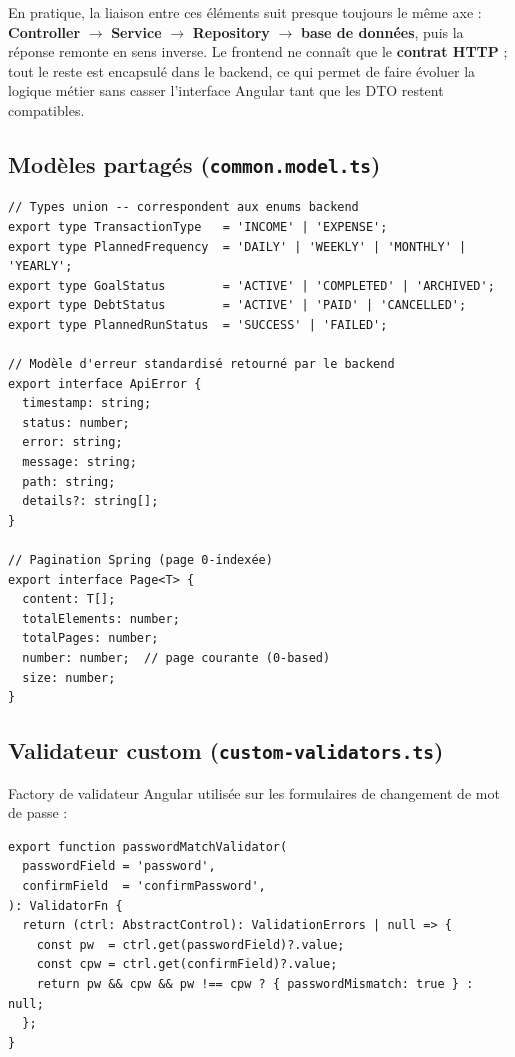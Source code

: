\documentclass[12pt,a4paper]{article}
\begin{document}
En pratique, la liaison entre ces éléments suit presque toujours le même axe :
\textbf{Controller} $\rightarrow$ \textbf{Service} $\rightarrow$ \textbf{Repository}
$\rightarrow$ \textbf{base de données}, puis la réponse remonte en sens inverse.
Le frontend ne connaît que le \textbf{contrat HTTP} ; tout le reste est encapsulé
dans le backend, ce qui permet de faire évoluer la logique métier sans casser
l'interface Angular tant que les DTO restent compatibles.

\subsection{Modèles partagés (\texttt{common.model.ts})}

\begin{lstlisting}
// Types union -- correspondent aux enums backend
export type TransactionType   = 'INCOME' | 'EXPENSE';
export type PlannedFrequency  = 'DAILY' | 'WEEKLY' | 'MONTHLY' | 'YEARLY';
export type GoalStatus        = 'ACTIVE' | 'COMPLETED' | 'ARCHIVED';
export type DebtStatus        = 'ACTIVE' | 'PAID' | 'CANCELLED';
export type PlannedRunStatus  = 'SUCCESS' | 'FAILED';

// Modèle d'erreur standardisé retourné par le backend
export interface ApiError {
  timestamp: string;
  status: number;
  error: string;
  message: string;
  path: string;
  details?: string[];
}

// Pagination Spring (page 0-indexée)
export interface Page<T> {
  content: T[];
  totalElements: number;
  totalPages: number;
  number: number;  // page courante (0-based)
  size: number;
}
\end{lstlisting}

\subsection{Validateur custom (\texttt{custom-validators.ts})}

Factory de validateur Angular utilisée sur les formulaires de changement de mot de passe :

\begin{lstlisting}
export function passwordMatchValidator(
  passwordField = 'password',
  confirmField  = 'confirmPassword',
): ValidatorFn {
  return (ctrl: AbstractControl): ValidationErrors | null => {
    const pw  = ctrl.get(passwordField)?.value;
    const cpw = ctrl.get(confirmField)?.value;
    return pw && cpw && pw !== cpw ? { passwordMismatch: true } : null;
  };
}
\end{lstlisting}
\end{document}
